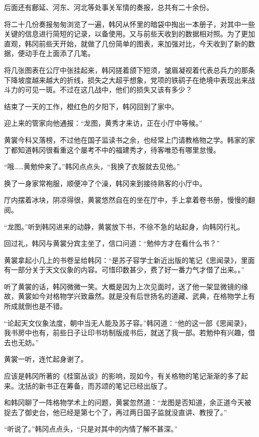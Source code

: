 后面还有鄜延、河东、河北等处事关军情的奏报，总共有二十余份。

将二十几份奏报匆匆浏览了一遍，韩冈从怀里的暗袋中掏出一本册子，对其中一些关键的信息进行简短的记录，以备使用。又与前些天收到的数据相对照。为了更加直观，韩冈前些天开始，就做了几份简单的图表，来加强对比，今天收到了新的数据，便动手在上面添了几笔。

将几张图表在公厅中张挂起来，韩冈搓着颌下短须，皱眉凝视着代表总兵力的那条下降坡度越来越大的折线，损失之大超乎想象，党项的铁鹞子在绝境中表现出来战斗力的可见一斑。不过在这几战中，他们的损失又该有多少？

结束了一天的工作，橙红色的夕阳下，韩冈回到了家中。

迎上来的管家向他通报：“龙图，黄秀才来访，正在小厅中等候。”

黄裳今科又落榜，不过他在国子监读书之余，也经常上门请教格物之学。韩家的家丁都知道韩冈很看重这个屡考不中的福建秀才，待客唯恐有哪里怠慢。

“哦……黄勉仲来了。”韩冈点点头，“我换了衣服就去见他。”

换了一身家常袍服，顺便冲了个澡，韩冈来到接待熟客的小厅中。

厅内摆着冰块，阴凉得很，黄裳悠然自在的坐在厅中，手上拿着卷书册，慢慢的翻阅。

“龙图。”听到韩冈进来的动静，黄裳放下书，不徐不急的站起身，向韩冈行礼。

回过礼，韩冈与黄裳分宾主坐了，信口问道：“勉仲方才在看什么书？”

黄裳拿起小几上的书卷呈给韩冈：“是苏子容学士新近出版的笔记《思闻录》，里面有一部分关于天文仪象的内容。可惜印数甚少，费了好一番力气才借了出来。。”

听了黄裳的话，韩冈微微一笑。大概是因为上次见面时，送了他一架显微镜的缘故，黄裳如今对格物学兴致盎然。就是没有后世扬名的道藏、武典，在格物学上有所成就倒也是不错。

“论起天文仪象法度，朝中当无人能及苏子容。”韩冈道：“他的这一部《思闻录》，我书房中也有，前些日子让印书坊制版成书后，就送了我一部。若勉仲有兴趣，借去也无妨。”

黄裳一听，连忙起身谢了。

应该是韩冈所著的《桂窗丛谈》的影响，现如今，有关格物的笔记渐渐的多了起来。沈括的新书正在筹备，而苏颂的笔记已经出版了。

和韩冈聊了一阵格物学术上的问题，黄裳忽然道：“龙图是否知道，余正道今天被捉去了御史台，他已经是第七个了，再过两日国子监就没直讲、教授了。”

“听说了。”韩冈点点头，“只是对其中的内情了解不甚深。”

